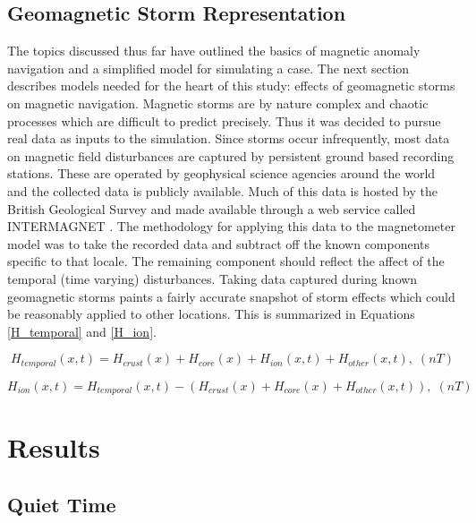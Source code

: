 \documentclass[conf]{new-aiaa}
\begin{document}
\subsection{Geomagnetic Storm Representation} \label{geostorm_rep} %

The topics discussed thus far have outlined the basics of magnetic anomaly navigation and a simplified model for simulating a case. The next section describes models needed for the heart of this study: effects of geomagnetic storms on magnetic navigation. Magnetic storms are by nature complex and chaotic processes which are difficult to predict precisely. Thus it was decided to pursue real data as inputs to the simulation. Since storms occur infrequently, most data on magnetic field disturbances are captured by persistent ground based recording stations. These are operated by geophysical science agencies around the world and the collected data is publicly available. Much of this data is hosted by the British Geological Survey and made available through a web service called INTERMAGNET \cite{intramagnet}. The methodology for applying this data to the magnetometer model was to take the recorded data and subtract off the known components specific to that locale. The remaining component should reflect the affect of the temporal (time varying) disturbances. Taking data captured during known geomagnetic storms paints a fairly accurate snapshot of storm effects which could be reasonably applied to other locations. This is summarized in Equations \ref{H_temporal} and \ref{H_ion}.

\begin{equation} \label{H_temporal}
    H_{temporal}(x, t) = H_{crust}(x) + H_{core}(x) + H_{ion}(x, t) + H_{other}(x, t), \; (nT)
\end{equation}

\begin{equation} \label{H_ion}
    H_{ion}(x, t) = H_{temporal}(x, t) - (H_{crust}(x) + H_{core}(x) + H_{other}(x, t)), \; (nT)
\end{equation}

\section{Results} %



\subsection{Quiet Time} %
\end{document}
